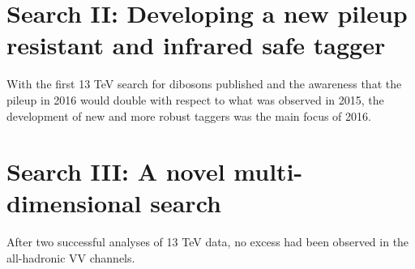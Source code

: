 \vspace*{\fill}\newpage


\vspace*{\fill}\newpage
\vspace*{\fill}
\section*{Search II: Developing a new pileup resistant and infrared safe tagger}
With the first 13 TeV search for dibosons published and the awareness that the pileup in 2016 would double with respect to what was observed in 2015, the development of new and more robust taggers was the main focus of 2016. 
\vspace*{\fill}\newpage


\vspace*{\fill}\newpage
\vspace*{\fill}
\section*{Search III: A novel multi-dimensional search}
After two successful analyses of 13 TeV data, no excess had been observed in the all-hadronic VV channels.
\vspace*{\fill}\newpage





